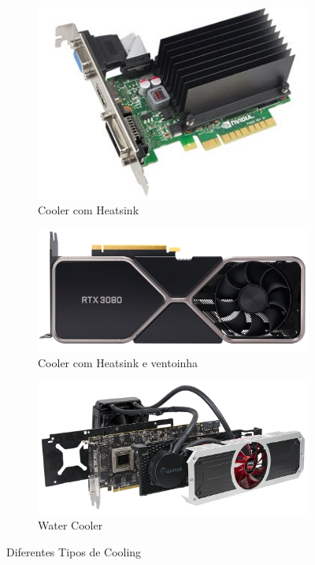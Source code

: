 \documentclass{report}
\begin{document}
\begin{figure}[h]
     \centering
     \begin{subfigure}[b]{0.3\textwidth}
         \centering
         \includegraphics[width=\textwidth]{heatsink.png}
         \caption{Cooler com Heatsink}
         \label{heats}
     \end{subfigure}
     \hfill
     \begin{subfigure}[b]{0.3\textwidth}
         \centering
         \includegraphics[width=\textwidth]{faneheatsink.png}
         \caption{Cooler com Heatsink e ventoinha}
         \label{heatvent}
     \end{subfigure}
     \hfill
     \begin{subfigure}[b]{0.3\textwidth}
         \centering
         \includegraphics[width=\textwidth]{cooler.jpg}
         \caption{Water Cooler}
         \label{fig:five over x}
     \end{subfigure}
        \caption{Diferentes Tipos de Cooling}
        \label{watercooler}
\end{figure}
\end{document}
